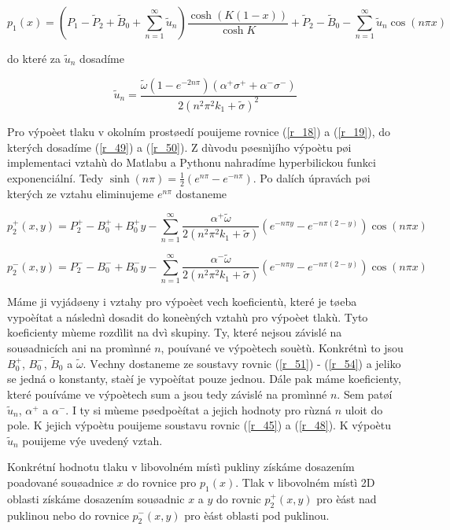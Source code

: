 \documentclass[a4paper,10pt]{article}
\begin{document}
\begin{equation}
\nonumber
p_1(x) = \left(P_1 - \tilde{P}_2 + \tilde{B}_0 + \sum\limits_{n=1}^{\infty} \tilde{u}_n \right) \frac{\cosh(K(1 - x))}{\cosh K} + \tilde{P}_2 - \tilde{B}_0 - \sum\limits_{n=1}^{\infty} \tilde{u}_n \cos(n \pi x)
\end{equation}

\noindent
do které za $\tilde{u}_n$ dosadíme

\begin{equation}
\nonumber
\tilde{u}_n = \frac{\tilde{\omega} \left( 1 - e^{-2n\pi} \right) \left( \alpha^+ \sigma^+ + \alpha^- \sigma^- \right)}{2 \left( n^2 \pi^2 k_1 + \tilde{\sigma} \right)^2}
\end{equation}

\noindent
Pro výpoèet tlaku v okolním prostøedí pouijeme rovnice (\ref{r_18}) a (\ref{r_19}), do kterých dosadíme (\ref{r_49}) a (\ref{r_50}). Z dùvodu pøesnìjího výpoètu pøi implementaci vztahù do Matlabu a Pythonu nahradíme hyperbilickou funkci exponenciální. Tedy $\sinh(n\pi) = \frac{1}{2} \left( e^{n\pi} - e^{-n\pi} \right)$. Po dalích úpravách pøi kterých ze vztahu eliminujeme $e^{n\pi}$ dostaneme

\begin{equation}
\nonumber
p_2^+(x,y) = P_2^+ - B_0^+ + B_0^+y - \sum\limits_{n=1}^{\infty} \frac{\alpha^+ \tilde{\omega} }{2 \left( n^2 \pi^2 k_1 + \tilde{\sigma} \right)} \left( e^{-n\pi y} - e^{-n\pi(2-y)} \right) \cos(n\pi x )
\end{equation}

\begin{equation}
\nonumber
p_2^-(x,y) = P_2^- - B_0^- + B_0^-y - \sum\limits_{n=1}^{\infty} \frac{\alpha^- \tilde{\omega} }{2 \left( n^2 \pi^2 k_1 + \tilde{\sigma} \right)} \left( e^{-n\pi y} - e^{-n\pi(2-y)} \right) \cos(n\pi x )
\end{equation}

\noindent
Máme ji vyjádøeny i vztahy pro výpoèet vech koeficientù, které je tøeba vypoèítat a následnì dosadit do koneèných vztahù pro výpoèet tlakù. Tyto koeficienty mùeme rozdìlit na dvì skupiny. Ty, které nejsou závislé na souøadnicích ani na promìnné $n$, pouívané ve výpoètech souètù. Konkrétnì to jsou $B_0^+$, $B_0^-$, $\tilde{B}_0$ a  $\tilde{\omega}$. Vechny dostaneme ze soustavy rovnic (\ref{r_51}) - (\ref{r_54}) a jeliko se jedná o konstanty, staèí je vypoèítat pouze jednou. Dále pak máme koeficienty, které pouíváme ve výpoètech sum a jsou tedy závislé na promìnné $n$. Sem patøí $\tilde{u}_n$, $\alpha^+$ a $\alpha^-$. I ty si mùeme pøedpoèítat a jejich hodnoty pro rùzná $n$ uloit do pole. K jejich výpoètu pouijeme soustavu rovnic (\ref{r_45}) a (\ref{r_48}). K výpoètu $\tilde{u}_n$ pouijeme výe uvedený vztah.

Konkrétní hodnotu tlaku v libovolném místì pukliny získáme dosazením poadované souøadnice $x$ do rovnice pro $p_1(x)$. Tlak v libovolném místì 2D oblasti získáme dosazením souøadnic $x$ a $y$ do rovnic $p_2^+(x,y)$ pro èást nad puklinou nebo do rovnice $p_2^-(x,y)$ pro èást oblasti pod puklinou.
\end{document}
